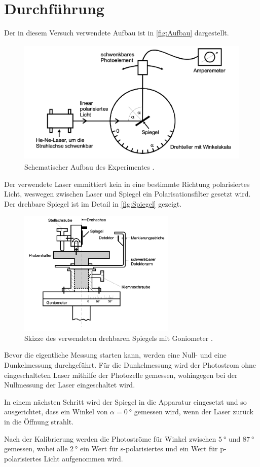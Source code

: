 \section{Durchführung}
\label{sec:Durchführung}
Der in diesem Versuch verwendete Aufbau ist in \autoref{fig:Aufbau} dargestellt.
\begin{figure}[H]
    \centering
    \includegraphics[height=6cm]{content/pics/Aufbau.png}
    \caption{Schematischer Aufbau des Experimentes \cite{v407}.}
    \label{fig:Aufbau}
\end{figure}
Der verwendete Laser emmittiert kein in eine bestimmte Richtung polarisiertes Licht, weswegen zwischen Laser und
Spiegel ein Polarisationsfilter gesetzt wird. Der drehbare Spiegel ist im Detail in 
\autoref{fig:Spiegel} gezeigt.
\begin{figure}[H]
    \centering
    \includegraphics[height=6cm]{content/pics/Goniometer.png}
    \caption{Skizze des verwendeten drehbaren Spiegels mit Goniometer \cite{v407}.}
    \label{fig:Spiegel}
\end{figure}

Bevor die eigentliche Messung starten kann, werden eine Null- und eine Dunkelmessung durchgeführt.
Für die Dunkelmessung wird der Photostrom ohne eingeschalteten Laser mithilfe der Photozelle gemessen, wohingegen bei
der Nullmessung der Laser eingeschaltet wird.

In einem nächsten Schritt wird der Spiegel in die Apparatur eingesetzt und so ausgerichtet, dass ein Winkel von
$\alpha = \qty{0}{\degree}$ gemessen wird, wenn der Laser zurück in die Öffnung strahlt.

Nach der Kalibrierung werden die Photoströme für Winkel zwischen $\qty{5}{\degree}$ und $\qty{87}{\degree}$ gemessen,
wobei alle $\qty{2}{\degree}$ ein Wert für s-polarisiertes und ein Wert für p-polarisiertes Licht aufgenommen wird.
